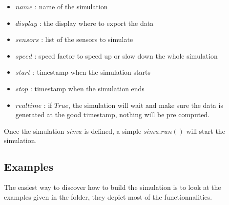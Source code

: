 \begin{itemize}
    \item $name$ : name of the simulation
    \item $display$ : the display where to export the data
    \item $sensors$ : list of the sensors to simulate
    \item $speed$ : speed factor to speed up or slow down the whole simulation
    \item $start$ : timestamp when the simulation starts
    \item $stop$ : timestamp when the simulation ends
    \item $realtime$ : if $True$, the simulation will wait and make sure the
data is generated at the good timestamp, nothing will be pre computed.
\end{itemize}

Once the simulation $simu$ is defined, a simple $simu.run()$ will start the
simulation.

\subsection{Examples}
The easiest way to discover how to build the simulation is to look at the
examples given in the folder, they depict most of the functionnalities.
